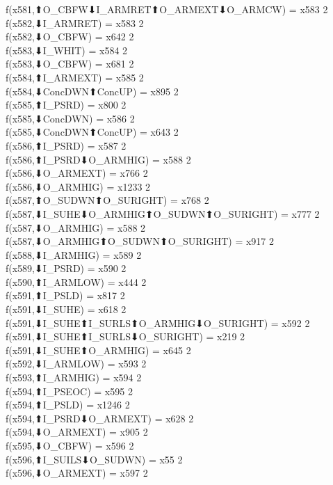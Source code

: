 f(x581,⬆O_CBFW⬇I_ARMRET⬆O_ARMEXT⬇O_ARMCW) = x583 {2} \\
f(x582,⬇I_ARMRET) = x583 {2} \\
f(x582,⬇O_CBFW) = x642 {2} \\
f(x583,⬇I_WHIT) = x584 {2} \\
f(x583,⬇O_CBFW) = x681 {2} \\
f(x584,⬆I_ARMEXT) = x585 {2} \\
f(x584,⬇ConcDWN⬆ConcUP) = x895 {2} \\
f(x585,⬆I_PSRD) = x800 {2} \\
f(x585,⬇ConcDWN) = x586 {2} \\
f(x585,⬇ConcDWN⬆ConcUP) = x643 {2} \\
f(x586,⬆I_PSRD) = x587 {2} \\
f(x586,⬆I_PSRD⬇O_ARMHIG) = x588 {2} \\
f(x586,⬇O_ARMEXT) = x766 {2} \\
f(x586,⬇O_ARMHIG) = x1233 {2} \\
f(x587,⬆O_SUDWN⬆O_SURIGHT) = x768 {2} \\
f(x587,⬇I_SUHE⬇O_ARMHIG⬆O_SUDWN⬆O_SURIGHT) = x777 {2} \\
f(x587,⬇O_ARMHIG) = x588 {2} \\
f(x587,⬇O_ARMHIG⬆O_SUDWN⬆O_SURIGHT) = x917 {2} \\
f(x588,⬇I_ARMHIG) = x589 {2} \\
f(x589,⬇I_PSRD) = x590 {2} \\
f(x590,⬆I_ARMLOW) = x444 {2} \\
f(x591,⬆I_PSLD) = x817 {2} \\
f(x591,⬇I_SUHE) = x618 {2} \\
f(x591,⬇I_SUHE⬆I_SURLS⬆O_ARMHIG⬇O_SURIGHT) = x592 {2} \\
f(x591,⬇I_SUHE⬆I_SURLS⬇O_SURIGHT) = x219 {2} \\
f(x591,⬇I_SUHE⬆O_ARMHIG) = x645 {2} \\
f(x592,⬇I_ARMLOW) = x593 {2} \\
f(x593,⬆I_ARMHIG) = x594 {2} \\
f(x594,⬆I_PSEOC) = x595 {2} \\
f(x594,⬆I_PSLD) = x1246 {2} \\
f(x594,⬆I_PSRD⬇O_ARMEXT) = x628 {2} \\
f(x594,⬇O_ARMEXT) = x905 {2} \\
f(x595,⬇O_CBFW) = x596 {2} \\
f(x596,⬆I_SUILS⬇O_SUDWN) = x55 {2} \\
f(x596,⬇O_ARMEXT) = x597 {2} \\
